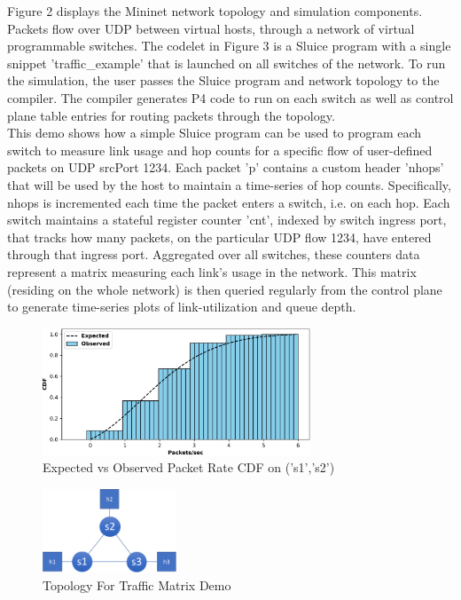 \noindent Figure 2 displays the Mininet network topology and simulation components. Packets flow over UDP between virtual hosts, through a network of virtual programmable switches. The codelet in Figure 3 is a Sluice program with a single snippet 'traffic\_example' that is launched on all switches of the network. To run the simulation, the user passes the Sluice program and network topology to the compiler. The compiler generates P4 code to run on each switch as well as control plane table entries for routing packets through the topology.  \\
\indent This demo shows how a simple Sluice program can be used to program each switch to measure link usage and hop counts for a specific flow of user-defined packets on UDP srcPort 1234. Each packet 'p' contains a custom header 'nhops' that will be used by the host to maintain a time-series of hop counts. Specifically, nhops is incremented each time the packet enters a switch, i.e. on each hop. Each switch maintains a stateful register counter 'cnt', indexed by switch ingress port, that tracks how many packets, on the particular UDP flow 1234, have entered through that ingress port. Aggregated over all switches, these counters data represent a matrix measuring each link's usage in the network. This matrix (residing on the whole network) is then queried regularly from the control plane to generate time-series plots of link-utilization and queue depth.  

\begin{figure}[tp]
\centering
\includegraphics[width=80mm,scale=0.7]{figures/exp_obs_cdf}
\caption{Expected vs Observed Packet Rate CDF on ('s1','s2')}
\end{figure}


\begin{figure}[tp]
\centering
\includegraphics[width=40mm,scale=0.7]{figures/traf_mat_topo}
\caption{Topology For Traffic Matrix Demo}
\end{figure}

